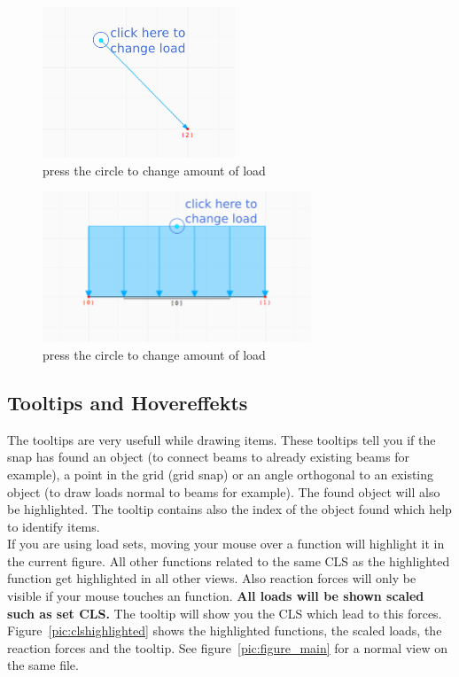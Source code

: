 \documentclass[a4paper,11pt]{report}
\begin{document}
\begin{minipage}[h]{0.5\textwidth-0.5cm}
\begin{figure}[H]
\begin{center}
\includegraphics[height=4.5cm]{../pictures/nloadbubble.png}
\caption{press the circle to change amount of load}
\label{pic:nloadbubble}
\end{center}
\end{figure}
\end{minipage}
\hfill
\begin{minipage}[h]{0.5\textwidth-0.5cm}
\begin{figure}[H]
\begin{center}
\includegraphics[height=4.5cm]{../pictures/sloadbubble.png}
\caption{press the circle to change amount of load}
\label{pic:sloadbubble}
\end{center}
\end{figure}
\end{minipage}


\subsection{Tooltips and Hovereffekts}

The tooltips are very usefull while drawing items. These tooltips tell you if the snap has found an object (to connect beams to already existing beams for example), a point in the grid (grid snap) or an angle orthogonal to an existing object (to draw loads normal to beams for example). The found object will also be highlighted. The tooltip contains also the index of the object found which help to identify items.\\
If you are using load sets, moving your mouse over a function will highlight it in the current figure. All other functions related to the same CLS as the highlighted function get highlighted in all other views. Also reaction forces will only be visible if your mouse touches an function. \textbf{All loads will be shown scaled such as set CLS.} The tooltip will show you the CLS which lead to this forces. Figure~\ref{pic:clshighlighted} shows the highlighted functions, the scaled loads, the reaction forces and the tooltip. See figure~\ref{pic:figure_main} for a normal view on the same file.
\end{document}
